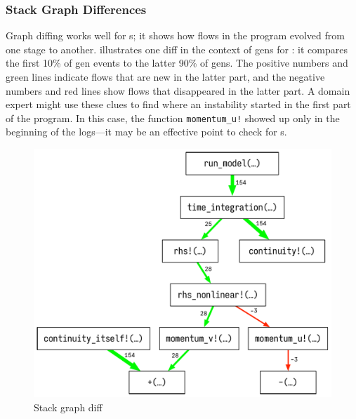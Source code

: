 \documentclass{juliacon}
\begin{document}


\subsubsection{Stack Graph Differences}

Graph diffing works well for \CSTG{}s; it shows how flows in the program evolved
from one stage to another.
 illustrates one diff in the context of \NaN{} gens for
\ShallowWaters{}:
it compares the first 10\% of gen events to the latter 90\% of gens.
The positive numbers and green lines indicate flows that are new in the latter part,
and the negative numbers and red lines show flows that disappeared in the latter part.
A domain expert might use these clues to find where an instability started in
the first part of the program.
In this case, the function \texttt{momentum\_u!} showed up only in the
beginning of the logs---it may be an effective point to check for \Nan{}s.

\begin{figure}[t]
  \centering
  \includegraphics[width=0.96\columnwidth]{./fig/cstg_diff_pretty.pdf}
  \caption{Stack graph diff}
  \label{fig:cstg_diff_demo}
\end{figure}
\end{document}
